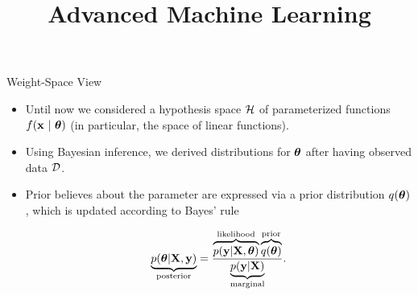 \documentclass[11pt,compress,t,notes=noshow, xcolor=table]{beamer}
\title{Advanced Machine Learning}
\date{}
\begin{document}


\begin{vbframe}{Weight-Space View}

\begin{itemize}
  \item Until now we considered a hypothesis space $\mathcal{H}$ of parameterized functions $f(\mathbf{x} ~|~ \bm{\theta})$ (in particular, the space of linear functions). 
  \item Using Bayesian inference, we derived distributions for $\bm{\theta}$ after having observed data $\mathcal{D}$. 
  \item Prior believes about the parameter are expressed via a prior distribution $q(\bm{\theta})$, which is updated according to Bayes' rule 

  $$
  \underbrace{p(\bm{\theta} | \mathbf{X}, \mathbf{y})}_{\text{posterior}} = \frac{\overbrace{p(\mathbf{y} | \mathbf{X}, \bm{\theta})}^{\text{likelihood}}\overbrace{q(\bm{\theta})}^{\text{prior}}}{\underbrace{p(\mathbf{y}|\mathbf{X})}_{\text{marginal}}}. 
  $$
\end{itemize}

\end{vbframe}
\end{document}
